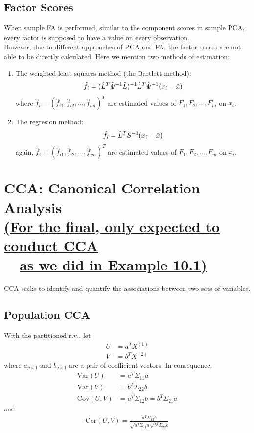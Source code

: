 \documentclass[12pt]{extarticle}
\newcommand{\<}{\langle}
\renewcommand{\>}{\rangle}
\theoremstyle{definition}
\begin{document}
\subsection{Factor Scores}
When sample FA is performed, similar to the component scores in sample PCA, every factor is supposed to have a value on every observation.\\
However, due to different approaches of PCA and FA, the factor scores are not able to be directly calculated. Here we mention two methods of estimation:
\begin{enumerate}
    \item The weighted least squares method (the Bartlett method):
    \begin{align*}
        \hat{f}_i =(\hat{L}^T \hat{\Psi}^{-1} \hat{L})^{-1} \hat{L}^T \hat{\Psi}^{-1} (x_i -\Bar{x})
    \end{align*}
    where $\hat{f}_i = (\hat{f}_{i1},\hat{f}_{i2},...,\hat{f}_{im})^T$ are estimated values of $F_1,F_2,...,F_m$ on $x_i$.
    \item The regresion method:
    \begin{align*}
        \hat{f}_i = \hat{L}^T S^{-1} (x_i -\Bar{x})
    \end{align*}
    again, $\hat{f}_i = (\hat{f}_{i1},\hat{f}_{i2},...,\hat{f}_{im})^T$ are estimated values of $F_1,F_2,...,F_m$ on $x_i$.
\end{enumerate}

\newpage
\section{CCA: Canonical Correlation Analysis\\
\underline{(For the final, only expected to conduct CCA}\\
\ \ \underline{as we did in Example 10.1)}}
CCA seeks to identify and quantify the associations between two sets of variables.
\subsection{Population CCA}
With the partitioned r.v., let
\begin{align*}
    U &= a^T X^{(1)}\\
    V &= b^T X^{(2)}
\end{align*}
where $a_{p\times 1}$ and $b_{q\times 1}$ are a pair of coefficient vectors. In consequence,
\begin{align*}
    \text{Var}(U) &= a^T \Sigma_{11} a\\
    \text{Var}(V) &= b^T \Sigma_{22} b\\
    \text{Cov}(U,V) &= a^T \Sigma_{12} b = b^T \Sigma_{21} a
\end{align*}
and
\begin{align*}
    \text{Cor}(U,V) = \frac{a^T \Sigma_{12} b}{\sqrt{a^T \Sigma_{11} a}\sqrt{b^T \Sigma_{22} b}}
\end{align*}
\end{document}
